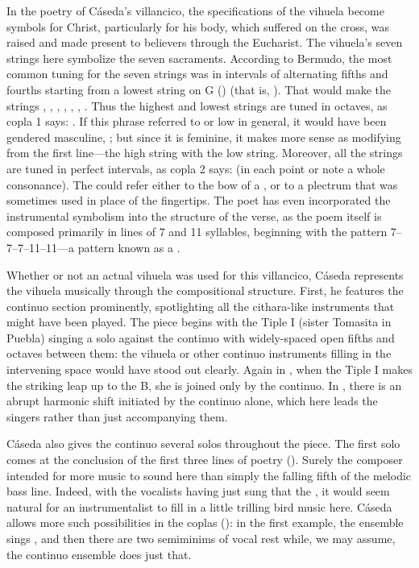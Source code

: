 In the poetry of Cáseda's villancico, the specifications of the vihuela become
symbols for Christ, particularly for his body, which suffered on the cross, was
raised and made present to believers through the Eucharist.
The vihuela's seven strings here symbolize the seven sacraments.
According to Bermudo, the most common tuning for the seven strings was in
intervals of alternating fifths and fourths starting from a lowest string on G
() (that is, ).%
    \Autocite[109r--109v]{Bermudo:Declaracion}
That would make the strings , , ,
, , , .
Thus the highest and lowest strings are tuned in octaves, as copla 1 says:
.
If this phrase referred to  or low in general, it
would have been gendered masculine, ; but since it
is feminine, it makes more sense as modifying  from the first
line---the high string with the low string.
Moreover, all the strings are tuned in perfect intervals, as copla 2 says:
 (in each point or note a whole
consonance).
The  could refer either to the bow of a , or
to a plectrum that was sometimes used in place of the fingertips.
The poet has even incorporated the instrumental symbolism into the structure of
the verse, as the poem itself is composed primarily in lines of 7 and 11
syllables, beginning with the pattern 7--7--7--11--11---a pattern known as a
.

Whether or not an actual vihuela was used for this villancico, Cáseda
represents the vihuela musically through the compositional structure.
First, he features the continuo section prominently, spotlighting all the
cithara-like instruments that might have been played.
The piece begins with the Tiple I (sister Tomasita in Puebla) singing a solo
against the continuo with widely-spaced open fifths and octaves between them:
the vihuela or other continuo instruments filling in the intervening space
would have stood out clearly.
Again in , when the Tiple I makes the striking leap up to the
B\fl{}, she is joined only by the continuo.
In , there is an abrupt harmonic shift initiated by the continuo
alone, which here leads the singers rather than just accompanying them.

Cáseda also gives the continuo several solos throughout the piece.
The first solo comes at the conclusion of the first three lines of poetry
().
Surely the composer intended for more music to sound here than simply the
falling fifth of the melodic bass line.
Indeed, with the vocalists having just sung that the , it would seem natural for an instrumentalist
to fill in a little trilling bird music here.
Cáseda allows more such possibilities in the coplas (): in the first example, the ensemble sings , and then there are two semiminims of vocal rest while, we may
assume, the continuo ensemble does just that.

